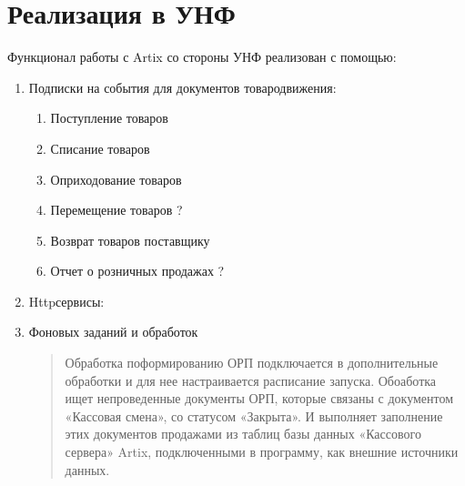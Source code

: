 \documentclass[letterpaper,10pt,russian]{sphinxmanual}
\begin{document}
\chapter{Реализация в УНФ}
\label{\detokenize{unf:id1}}\label{\detokenize{unf::doc}}
\sphinxAtStartPar
Функционал работы с Artix со стороны УНФ реализован с помощью:
\begin{enumerate}
%
\item {} 
\sphinxAtStartPar
Подписки на события для документов товародвижения:
\begin{enumerate}
%
\item {} 
\sphinxAtStartPar
Поступление товаров

\item {} 
\sphinxAtStartPar
Списание товаров

\item {} 
\sphinxAtStartPar
Оприходование товаров

\item {} 
\sphinxAtStartPar
Перемещение товаров ?

\item {} 
\sphinxAtStartPar
Возврат товаров поставщику

\item {} 
\sphinxAtStartPar
Отчет о розничных продажах ?

\end{enumerate}

\item {} 
\sphinxAtStartPar
Http\sphinxhyphen{}сервисы:
\begin{quote}

\sphinxAtStartPar
{}

\sphinxAtStartPar
{}

\sphinxAtStartPar
{}
\end{quote}

\item {} 
\sphinxAtStartPar
Фоновых заданий и обработок
\begin{quote}

\sphinxAtStartPar
Обработка поформированию ОРП подключается в дополнительные обработки и для нее настраивается расписание запуска.
Обоаботка ищет непроведенные документы ОРП, которые связаны с документом «Кассовая смена», со статусом «Закрыта».
И выполняет заполнение этих документов продажами из таблиц базы данных «Кассового сервера» Artix, подключенными в программу, как
внешние источники данных.
\end{quote}

\end{enumerate}
\end{document}
